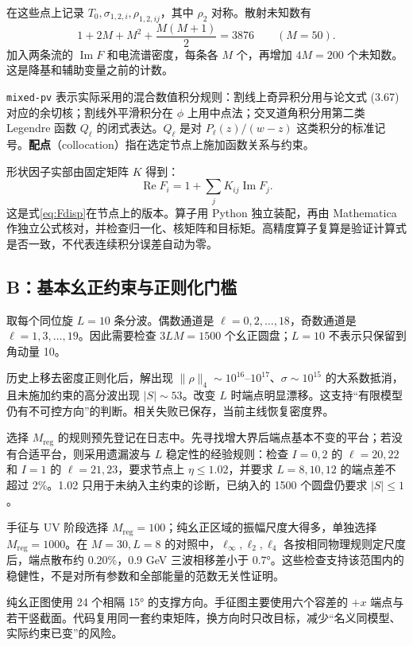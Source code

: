 \documentclass[UTF8,a4paper,11pt,fontset=fandol]{ctexart}
\numberwithin{equation}{section}
\newcommand{\Ree}{\operatorname{Re}}
\newcommand{\Imm}{\operatorname{Im}}
\newcommand{\Mreg}{M_{\mathrm{reg}}}
\newcommand{\code}[1]{{\urlstyle{tt}\nolinkurl{#1}}}
\begin{document}
在这些点上记录 \(T_0,\sigma_{1,2,i},\rho_{1,2,ij}\)，其中 \(\rho_2\) 对称。散射未知数有
\begin{equation}
1+2M+M^2+\frac{M(M+1)}2=3876\qquad(M=50).
\end{equation}
加入两条流的 \(\Imm F\) 和电流谱密度，每条各 \(M\) 个，再增加 \(4M=200\) 个未知数。这是降基和辅助变量之前的计数。

\code{mixed-pv} 表示实际采用的混合数值积分规则：割线上奇异积分用与论文式 (3.67) 对应的余切核；割线外平滑积分在 \(\phi\) 上用中点法；交叉道角积分用第二类 Legendre 函数 \(Q_\ell\) 的闭式表达。\(Q_\ell\) 是对 \(P_\ell(z)/(w-z)\) 这类积分的标准记号。\textbf{配点}（collocation）指在选定节点上施加函数关系与约束。

形状因子实部由固定矩阵 \(K\) 得到：
\begin{equation}
\Ree F_i=1+\sum_jK_{ij}\Imm F_j.
\end{equation}
这是式\eqref{eq:Fdisp}在节点上的版本。算子用 Python 独立装配，再由 Mathematica 作独立公式核对，并检查归一化、核矩阵和目标矩。高精度算子复算是验证计算式是否一致，不代表连续积分误差自动为零。

\subsection{B：基本幺正约束与正则化门槛}
取每个同位旋 \(L=10\) 条分波。偶数通道是 \(\ell=0,2,\ldots,18\)，奇数通道是 \(\ell=1,3,\ldots,19\)。因此需要检查 \(3LM=1500\) 个幺正圆盘；\(L=10\) 不表示只保留到角动量 10。

历史上移去密度正则化后，解出现 \(\|\rho\|_4\sim10^{16}\)--\(10^{17}\)、\(\sigma\sim10^{15}\) 的大系数抵消，且未施加约束的高分波出现 \(|S|\sim53\)。改变 \(L\) 时端点明显漂移。这支持“有限模型仍有不可控方向”的判断。相关失败已保存，当前主线恢复密度界。

选择 \(\Mreg\) 的规则预先登记在日志中。先寻找增大界后端点基本不变的平台；若没有合适平台，则采用遗漏波与 \(L\) 稳定性的经验规则：检查 \(I=0,2\) 的 \(\ell=20,22\) 和 \(I=1\) 的 \(\ell=21,23\)，要求节点上 \(\eta\le1.02\)，并要求 \(L=8,10,12\) 的端点差不超过 2\%。1.02 只用于未纳入主约束的诊断，已纳入的 1500 个圆盘仍要求 \(|S|\le1\)。

手征与 UV 阶段选择 \(\Mreg=100\)；纯幺正区域的振幅尺度大得多，单独选择 \(\Mreg=1000\)。在 \(M=30,L=8\) 的对照中，\(\ell_\infty,\ell_2,\ell_4\) 各按相同物理规则定尺度后，端点散布约 0.20\%，0.9 GeV 三波相移差小于 0.7°。这些检查支持该范围内的稳健性，不是对所有参数和全部能量的范数无关性证明。

纯幺正图使用 24 个相隔 15° 的支撑方向。手征图主要使用六个容差的 \(+x\) 端点与若干竖截面。代码复用同一套约束矩阵，换方向时只改目标，减少“名义同模型、实际约束已变”的风险。
\end{document}
